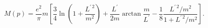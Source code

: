 \begin{equation}
\label{eq13}
M(p) = \frac{e^2}{\pi}m\left[\frac 34\ln\left(1 + \frac{L^{\prime\,2}}
{m^2}\right) + \frac{L^\prime}{2m}\arctan\frac m{L^\prime} -
\frac 18\frac{L^{\prime\,2}/m^2}{1 + L^{\prime\,2}/m^2}
\right].
\end{equation}


